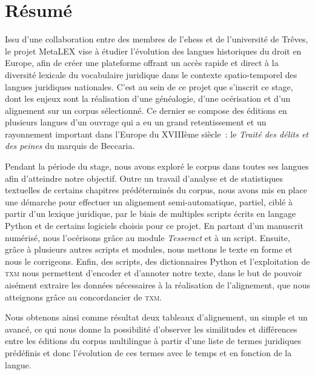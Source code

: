 \documentclass[a4paper,12pt, twoside]{book}
\begin{document}
\chapter*{Résumé}
Issu d'une collaboration entre des membres de l'\acrshort{ehess} et de l'université de Trêves, le projet MetaLEX vise à étudier l'évolution des langues historiques du droit en Europe, afin de créer une plateforme offrant un accès rapide et direct à la diversité lexicale du vocabulaire juridique dans le contexte spatio-temporel des langues juridiques nationales. C'est au sein de ce projet que s'inscrit ce stage, dont les enjeux sont la réalisation d'une généalogie, d'une océrisation et d'un alignement sur un corpus sélectionné. Ce dernier se compose des éditions en plusieurs langues d'un ouvrage qui a eu un grand retentissement et un rayonnement important dans l'Europe du XVIIIème siècle~: le \emph{Traité des délits et des peines} du marquis de Beccaria.

Pendant la période du stage, nous avons exploré le corpus dans toutes ses langues afin d'atteindre notre objectif. Outre un travail d'analyse et de statistiques textuelles de certains chapitres prédéterminés du corpus, nous avons mis en place une démarche pour effectuer un alignement semi-automatique, partiel, ciblé à partir d'un lexique juridique, par le biais de multiples scripts écrits en langage Python et de certains logiciels choisis pour ce projet. En partant d'un manuscrit numérisé, nous l'océrisons grâce au module \emph{Tesseract} et à un script. Ensuite, grâce à plusieurs autres scripts et modules, nous mettons le texte en forme et nous le corrigeons. Enfin, des scripts, des dictionnaires Python et l'exploitation de \textsc{txm} nous permettent d'encoder et d'annoter notre texte, dans le but de pouvoir aisément extraire les données nécessaires à la réalisation de l'alignement, que nous atteignons grâce au concordancier de \textsc{txm}.

Nous obtenons ainsi comme résultat deux tableaux d'alignement, un simple et un avancé, ce qui nous donne la possibilité d'observer les similitudes et différences entre les éditions du corpus multilingue à partir d'une liste de termes juridiques prédéfinis et donc l'évolution de ces termes avec le temps et en fonction de la langue.
\end{document}
